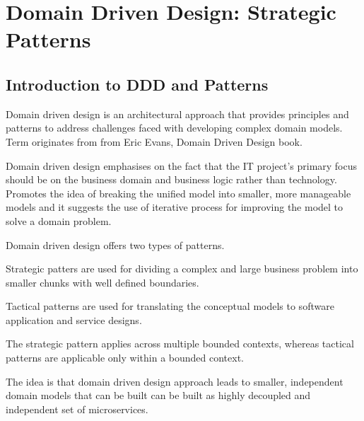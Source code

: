 \documentclass[a4paper, 11pt]{book}
\begin{document}

    \chapter{Domain Driven Design: Strategic Patterns}


    \section{Introduction to DDD and Patterns}
    Domain driven design is an architectural approach that provides principles and patterns to address challenges faced with developing complex domain models.
    Term originates from from Eric Evans, Domain Driven Design book.

    Domain driven design emphasises on the fact that the IT project's primary focus should be on the business domain and business logic rather than technology.
    Promotes the idea of breaking the unified model into smaller, more manageable models and it suggests the use of iterative process for improving the model to solve a domain problem.

    Domain driven design offers two types of patterns.

    Strategic patters are used for dividing a complex and large business problem into smaller chunks with well defined boundaries.

    Tactical patterns are used for translating the conceptual models to software application and service designs.

    The strategic pattern applies across multiple bounded contexts, whereas tactical patterns are applicable only within a bounded context.

    The idea is that domain driven design approach leads to smaller, independent domain models that can be built can be built as highly decoupled and independent set of microservices.
\end{document}
